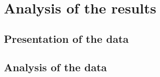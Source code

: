 \section{Analysis of the results}

\subsection{Presentation of the data}

\subsection{Analysis of the data}